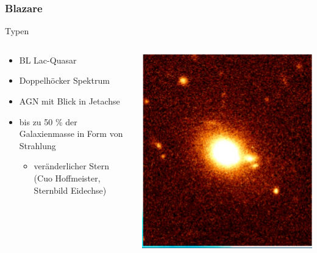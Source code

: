 \documentclass[aspectratio=1610, 9pt]{beamer}
\begin{document}
\begin{frame}\frametitle{Blazare}
  \begin{block}{Typen}
  \begin{columns}
  \begin{column}[c]{0.45\linewidth}
    \begin{itemize}
      \item BL Lac-Quasar
      \item Doppelh\"ocker Spektrum
      \item AGN mit Blick in Jetachse
      \item bis zu 50 \% der Galaxienmasse in Form von Strahlung
      \begin{itemize}
        \item ver\"anderlicher Stern (Cuo Hoffmeister, Sternbild Eidechse)
      \end{itemize}
    \end{itemize}
    \end{column}
    \begin{column}[c]{0.45\linewidth}
      \includegraphics{images/bl-lac-object.png}
    \end{column}
    \end{columns}
  \end{block}
\end{frame}
\end{document}
